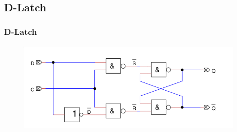\subsection{D-Latch} %
\label{sub:D-Latch}
\begin{frame}
    \frametitle{D-Latch}
    \framesubtitle{}
    \begin{figure}[H]
    \begin{center}
            \includegraphics[scale=0.4]{./img/schaltung/d_latch_neu.png}
    \end{center}
    \end{figure}
\end{frame}
